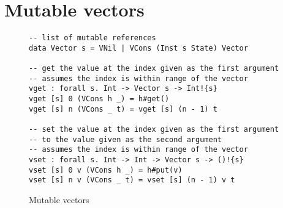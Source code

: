 \section{Mutable vectors}
\begin{figure}[h]
\caption{Mutable vectors}
\begin{verbatim}
-- list of mutable references
data Vector s = VNil | VCons (Inst s State) Vector

-- get the value at the index given as the first argument
-- assumes the index is within range of the vector
vget : forall s. Int -> Vector s -> Int!{s}
vget [s] 0 (VCons h _) = h#get()
vget [s] n (VCons _ t) = vget [s] (n - 1) t

-- set the value at the index given as the first argument
-- to the value given as the second argument
-- assumes the index is within range of the vector
vset : forall s. Int -> Int -> Vector s -> ()!{s}
vset [s] 0 v (VCons h _) = h#put(v)
vset [s] n v (VCons _ t) = vset [s] (n - 1) v t
\end{verbatim}
\label{fig:vectors}
\end{figure}

